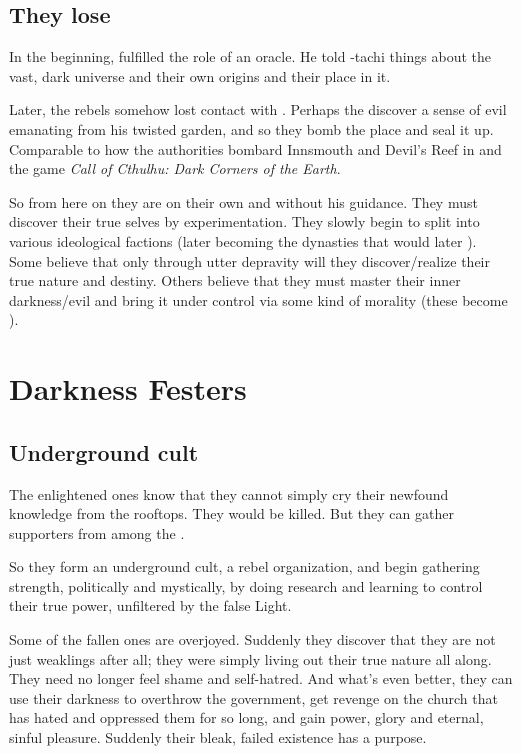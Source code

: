 \subsection[They lose Semiza]{They lose \Semiza}
In the beginning, \Semiza fulfilled the role of an oracle. 
He told \Damiarch-tachi things about the vast, dark universe and their own origins and their place in it.

Later, the rebels somehow lost contact with \Semiza. 
Perhaps the \Merkyrans{} discover a sense of evil emanating from his twisted garden, and so they bomb the place and seal it up. 
Comparable to how the authorities bombard Innsmouth and Devil's Reef in  and the game \emph{Call of Cthulhu: Dark Corners of the Earth}. 

So from here on they are on their own and without his guidance. 
They must discover their true selves by experimentation. 
They slowly begin to split into various ideological factions (later becoming the dynasties that would later ). 
Some believe that only through utter depravity will they discover/realize their true nature and destiny. 
Others believe that they must master their inner darkness/evil and bring it under control via some kind of morality (these become \CiriathSepher). 















\section{Darkness Festers}
\subsection{Underground cult}
The enlightened ones know that they cannot simply cry their newfound knowledge from the rooftops. They would be killed. But they can gather supporters from among the . 

So they form an underground cult, a rebel organization, and begin gathering strength, politically and mystically, by doing research and learning to control their true power, unfiltered by the false Light. 

Some of the fallen ones are overjoyed. Suddenly they discover that they are not just weaklings after all; they were simply living out their true nature all along. They need no longer feel shame and self-hatred. And what's even better, they can use their darkness to overthrow the government, get revenge on the church that has hated and oppressed them for so long, and gain power, glory and eternal, sinful pleasure. Suddenly their bleak, failed existence has a purpose. 

